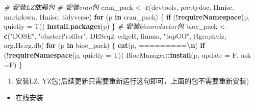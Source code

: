 \documentclass[
]{book}
\newenvironment{Shaded}{\begin{snugshade}}{\end{snugshade}}
\newcommand{\AttributeTok}[1]{\textcolor[rgb]{0.13,0.29,0.53}{#1}}
\newcommand{\CommentTok}[1]{\textcolor[rgb]{0.56,0.35,0.01}{\textit{#1}}}
\newcommand{\ControlFlowTok}[1]{\textcolor[rgb]{0.13,0.29,0.53}{\textbf{#1}}}
\newcommand{\FunctionTok}[1]{\textcolor[rgb]{0.13,0.29,0.53}{\textbf{#1}}}
\newcommand{\NormalTok}[1]{#1}
\newcommand{\OtherTok}[1]{\textcolor[rgb]{0.56,0.35,0.01}{#1}}
\newcommand{\SpecialCharTok}[1]{\textcolor[rgb]{0.81,0.36,0.00}{\textbf{#1}}}
\newcommand{\StringTok}[1]{\textcolor[rgb]{0.31,0.60,0.02}{#1}}
\providecommand{\tightlist}{%
  \setlength{\itemsep}{0pt}\setlength{\parskip}{0pt}}
\begin{document}
\begin{Shaded}
\begin{Highlighting}[]
\CommentTok{\# 安装LZ依赖包}
\CommentTok{\# 安装cran包}
\NormalTok{cran\_pack }\OtherTok{\textless{}{-}} \FunctionTok{c}\NormalTok{(}\StringTok{\textquotesingle{}devtools\textquotesingle{}}\NormalTok{, }\StringTok{\textquotesingle{}prettydoc\textquotesingle{}}\NormalTok{, }\StringTok{\textquotesingle{}Hmisc\textquotesingle{}}\NormalTok{, }\StringTok{\textquotesingle{}markdown\textquotesingle{}}\NormalTok{, }
               \StringTok{\textquotesingle{}Hmisc\textquotesingle{}}\NormalTok{, }\StringTok{\textquotesingle{}tidyverse\textquotesingle{}}\NormalTok{)}
\ControlFlowTok{for}\NormalTok{ (p }\ControlFlowTok{in}\NormalTok{ cran\_pack) \{ }
  \ControlFlowTok{if}\NormalTok{ (}\SpecialCharTok{!}\FunctionTok{requireNamespace}\NormalTok{(p, }\AttributeTok{quietly =}\NormalTok{ T)) }\FunctionTok{install.packages}\NormalTok{(p) }
\NormalTok{\}}
\CommentTok{\# 安装bioconductor包}
\NormalTok{bioc\_pack }\OtherTok{\textless{}{-}} \FunctionTok{c}\NormalTok{(}\StringTok{"DOSE"}\NormalTok{, }\StringTok{"clusterProfiler"}\NormalTok{, }\StringTok{\textquotesingle{}DESeq2\textquotesingle{}}\NormalTok{, }\StringTok{\textquotesingle{}edgeR\textquotesingle{}}\NormalTok{, }
               \StringTok{\textquotesingle{}limma\textquotesingle{}}\NormalTok{, }\StringTok{"topGO"}\NormalTok{, }\StringTok{\textquotesingle{}Rgraphviz\textquotesingle{}}\NormalTok{, }\StringTok{\textquotesingle{}org.Hs.eg.db\textquotesingle{}}\NormalTok{)}
\ControlFlowTok{for}\NormalTok{ (p }\ControlFlowTok{in}\NormalTok{ bioc\_pack) \{ }
  \FunctionTok{cat}\NormalTok{(p, }\StringTok{\textquotesingle{}=========}\SpecialCharTok{\textbackslash{}n}\StringTok{\textquotesingle{}}\NormalTok{) }
  \ControlFlowTok{if}\NormalTok{ (}\SpecialCharTok{!}\FunctionTok{requireNamespace}\NormalTok{(p, }\AttributeTok{quietly =}\NormalTok{ T)) }
\NormalTok{    BiocManager}\SpecialCharTok{::}\FunctionTok{install}\NormalTok{(p, }\AttributeTok{update =}\NormalTok{ F, }\AttributeTok{ask =}\NormalTok{F) }
\NormalTok{\}}
\end{Highlighting}
\end{Shaded}

\begin{enumerate}
\def\labelenumi{\arabic{enumi}.}
\setcounter{enumi}{1}
\tightlist
\item
  安装LZ, YZ包(后续更新只需要重新运行这句即可，上面的包不需要重新安装)
\end{enumerate}

\begin{itemize}
\tightlist
\item
  在线安装
\end{itemize}
\end{document}
